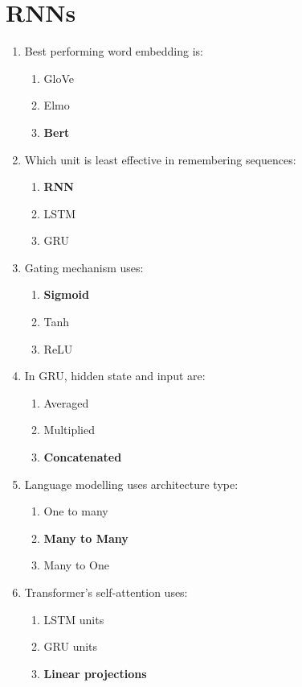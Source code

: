 \documentclass{report}
\numberwithin{equation}{section}
\begin{document}
\section{RNNs}

\begin{enumerate}
    \item Best performing word embedding is:
    \begin{enumerate}[label=\alph*.]
        \item GloVe
        \item Elmo
        \item \textbf{Bert}
    \end{enumerate}
    \item Which unit is least effective in remembering sequences:
    \begin{enumerate}[label=\alph*.]
        \item \textbf{RNN}
        \item LSTM
        \item GRU
    \end{enumerate}
    \item Gating mechanism uses:
    \begin{enumerate}[label=\alph*.]
        \item \textbf{Sigmoid}
        \item Tanh
        \item ReLU
    \end{enumerate}
    \item In GRU, hidden state and input are:
    \begin{enumerate}[label=\alph*.]
        \item Averaged
        \item Multiplied
        \item \textbf{Concatenated}
    \end{enumerate}
    \item Language modelling uses architecture type:
    \begin{enumerate}[label=\alph*.]
        \item One to many
        \item \textbf{Many to Many}
        \item Many to One
    \end{enumerate}
    \item Transformer's self-attention uses:
    \begin{enumerate}[label=\alph*.]
        \item LSTM units
        \item GRU units
        \item \textbf{Linear projections}
    \end{enumerate}
\end{enumerate}
\end{document}
